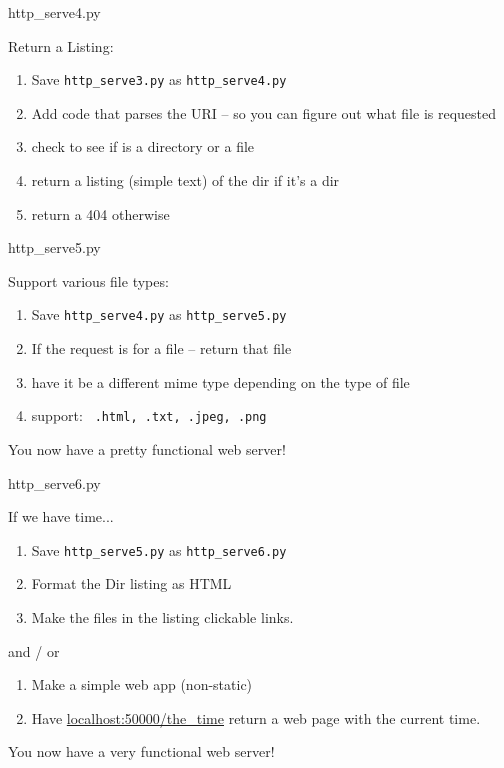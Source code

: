 \documentclass{beamer}
\begin{document}
\begin{frame}[fragile]{http\_serve4.py}

{\Large Return a Listing:}
\begin{enumerate}
  \item Save \verb|http_serve3.py|  as \verb|http_serve4.py|
  \item Add code that parses the URI -- so you can figure out what file is requested
  \item check to see if is a directory or a file
  \item return a listing (simple text) of the dir if it's a dir
  \item return a 404 otherwise
\end{enumerate}

\end{frame}

\begin{frame}[fragile]{http\_serve5.py}

{\Large Support various file types:}
\begin{enumerate}
  \item Save \verb|http_serve4.py|  as \verb|http_serve5.py|
  \item If the request is for a file -- return that file
  \item have it be a different mime type depending on the type of file
  \item support: \verb| .html, .txt, .jpeg, .png|
\end{enumerate}
\vfill
{\Large You now have a pretty functional web server!} 
\end{frame}

\begin{frame}[fragile]{http\_serve6.py}

{\Large If we have time...}
\begin{enumerate}
  \item Save \verb|http_serve5.py|  as \verb|http_serve6.py|
  \item Format the Dir listing as HTML
  \item Make the files in the listing clickable links.
\end{enumerate}
 and / or
\begin{enumerate}
  \item Make a simple web app (non-static)
  \item Have \url{localhost:50000/the_time} return a web page with the current time.
\end{enumerate}
\vfill
{\Large You now have a very functional web server!} 
\end{frame}
\end{document}
